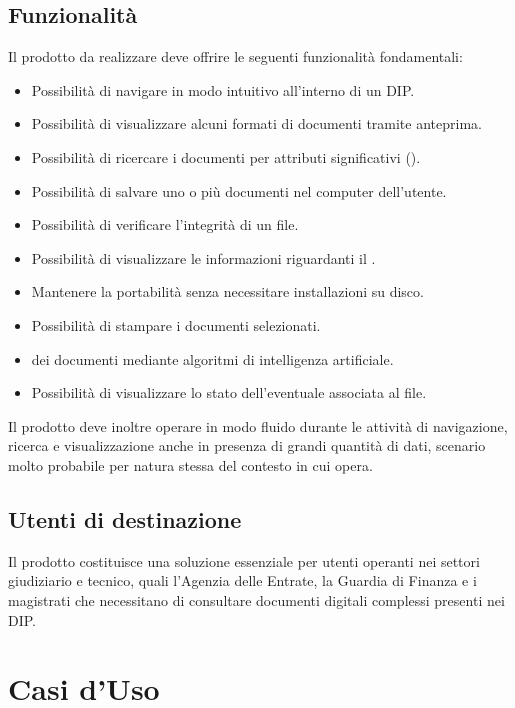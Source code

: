 \subsection{Funzionalità}
Il prodotto da realizzare deve offrire le seguenti funzionalità fondamentali:
\begin{itemize}
    \item Possibilità di navigare in modo intuitivo all'interno di un DIP.
    \item Possibilità di visualizzare alcuni formati di documenti tramite anteprima.
    \item Possibilità di ricercare i documenti per attributi significativi ().
    \item Possibilità di salvare uno o più documenti nel computer dell'utente.
    \item Possibilità di verificare l'integrità di un file.
    \item Possibilità di visualizzare le informazioni riguardanti il .
    \item Mantenere la portabilità senza necessitare installazioni su disco.
    \item Possibilità di stampare i documenti selezionati.
    \item {} dei documenti mediante algoritmi di intelligenza artificiale.
    \item Possibilità di visualizzare lo stato dell'eventuale  associata al file.
\end{itemize}
Il prodotto deve inoltre operare in modo fluido durante le attività di navigazione, ricerca e visualizzazione anche in presenza di grandi quantità di dati, scenario molto probabile per natura stessa del contesto in cui opera.

\subsection{Utenti di destinazione}
Il prodotto costituisce una soluzione essenziale per utenti operanti nei settori giudiziario e tecnico, quali l'Agenzia delle Entrate, la Guardia di Finanza e i magistrati che necessitano di consultare documenti digitali complessi presenti nei DIP.

\section{Casi d'Uso}


